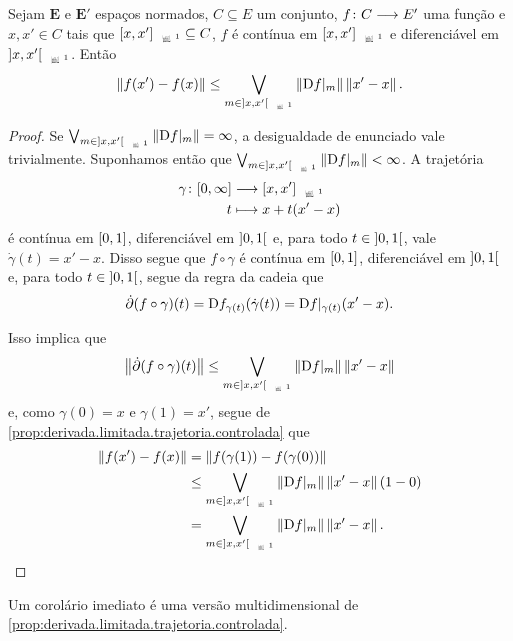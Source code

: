 \begin{proposition}
\label{prop:desigualdade.valor.medio}
Sejam $\bm E$ e $\bm E'$ espaços normados, $C \subseteq E$ um conjunto, ${f}\colon {C} \longrightarrow {E'}$ uma função e $x,x' \in C$ tais que $\Sxger{x,x'} \subseteq C$, $f$ é contínua em $\Sxger{x,x'}$ e diferenciável em $\Sxgera{x,x'}$. Então
	\begin{equation*}
	\nor{f(x') - f(x)} \leq \sup_{m \in \Sxgera{x,x'}} \nor{\D f|_m} \nor{x'-x}.
	\end{equation*}
\end{proposition}
\begin{proof}
Se $\sup_{m \in \Sxgera{x,x'}} \nor{\D f|_m} = \infty$, a desigualdade de enunciado vale trivialmente. Suponhamos então que $\sup_{m \in \Sxgera{x,x'}} \nor{\D f|_m} < \infty$. A trajetória
	\begin{align*}
	\func{\gamma}{\intff{0}{\infty}}{\Sxger{x,x'}}{t}{x + t(x'-x)}
	\end{align*}
é contínua em $\left[{0},{1}\right]$, diferenciável em $\left]{0},{1}\right[$ e, para todo $t \in \left]{0},{1}\right[$, vale $\dot \gamma(t) = x' - x$. Disso segue que $f \circ \gamma$ é contínua em $\left[{0},{1}\right]$, diferenciável em $\left]{0},{1}\right[$ e, para todo $t \in \left]{0},{1}\right[$, segue da regra da cadeia que
	\begin{equation*}
	\dot{\partial} (f \circ \gamma)(t) = \mathrm{D} f_{\gamma(t)}(\dot \gamma(t)) = \mathrm{D} f|_{\gamma(t)}(x'-x).
	\end{equation*}

Isso implica que
	\begin{equation*}
	\nor{\der (f \circ \gamma)(t)} \leq \sup_{m \in \Sxgera{x,x'}} \nor{\D f|_m} \nor{x'-x}
	\end{equation*}
e, como $\gamma(0) = x$ e $\gamma(1) = x'$, segue de \ref{prop:derivada.limitada.trajetoria.controlada} que
	\begin{align*}
	\nor{f(x') - f(x)} &= \nor{f(\gamma(1)) - f(\gamma(0))} \\
		&\leq \sup_{m \in \Sxgera{x,x'}} \nor{\D f|_m} \nor{x'-x} (1-0) \\
		&= \sup_{m \in \Sxgera{x,x'}} \nor{\D f|_m} \nor{x'-x}.
		\qedhere
	\end{align*}
\end{proof}

Um corolário imediato é uma versão multidimensional de \ref{prop:derivada.limitada.trajetoria.controlada}.

